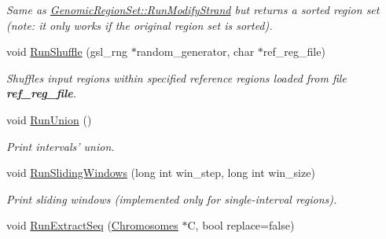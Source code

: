 \begin{CompactItemize}
\begin{CompactList}\small\item\em Same as \hyperlink{classGenomicRegionSet_f1146729843b82d7637e0adc1b07e51a}{GenomicRegionSet::RunModifyStrand} but returns a sorted region set (note: it only works if the original region set is sorted). \item\end{CompactList}\item 
\hypertarget{classGenomicRegionSet_015049fd0bd08587cbdbb49332ee352d}{
void \hyperlink{classGenomicRegionSet_015049fd0bd08587cbdbb49332ee352d}{RunShuffle} (gsl\_\-rng $\ast$random\_\-generator, char $\ast$ref\_\-reg\_\-file)}
\label{classGenomicRegionSet_015049fd0bd08587cbdbb49332ee352d}

\begin{CompactList}\small\item\em Shuffles input regions within specified reference regions loaded from file {\bf ref\_\-reg\_\-file}. \item\end{CompactList}\item 
\hypertarget{classGenomicRegionSet_b281c8ab57c4181a06161182031c9df4}{
void \hyperlink{classGenomicRegionSet_b281c8ab57c4181a06161182031c9df4}{RunUnion} ()}
\label{classGenomicRegionSet_b281c8ab57c4181a06161182031c9df4}

\begin{CompactList}\small\item\em Print intervals' union. \item\end{CompactList}\item 
\hypertarget{classGenomicRegionSet_a326d5adcc97f47ed2de35353b60b393}{
void \hyperlink{classGenomicRegionSet_a326d5adcc97f47ed2de35353b60b393}{RunSlidingWindows} (long int win\_\-step, long int win\_\-size)}
\label{classGenomicRegionSet_a326d5adcc97f47ed2de35353b60b393}

\begin{CompactList}\small\item\em Print sliding windows (implemented only for single-interval regions). \item\end{CompactList}\item 
\hypertarget{classGenomicRegionSet_b219b834c232c091982b066a2163f76a}{
void \hyperlink{classGenomicRegionSet_b219b834c232c091982b066a2163f76a}{RunExtractSeq} (\hyperlink{classChromosomes}{Chromosomes} $\ast$C, bool replace=false)}
\label{classGenomicRegionSet_b219b834c232c091982b066a2163f76a}


\end{CompactItemize}
